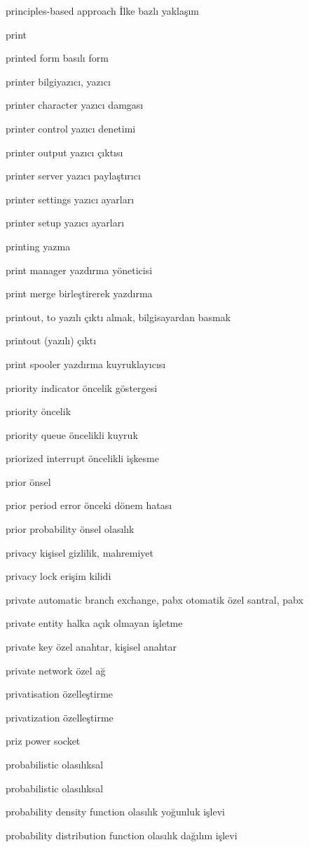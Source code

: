 \documentclass[12pt,fleqn]{article}\usepackage{../../common}
\begin{document}
principles-based approach İlke bazlı yaklaşım

print

printed form basılı form

printer bilgiyazıcı, yazıcı

printer character yazıcı damgası

printer control yazıcı denetimi

printer output yazıcı çıktısı

printer server yazıcı paylaştırıcı

printer settings yazıcı ayarları

printer setup yazıcı ayarları

printing yazma

print manager yazdırma yöneticisi

print merge birleştirerek yazdırma

printout, to yazılı çıktı almak, bilgisayardan basmak

printout (yazılı) çıktı

print spooler yazdırma kuyruklayıcısı

priority indicator öncelik göstergesi

priority öncelik

priority queue öncelikli kuyruk

priorized interrupt öncelikli işkesme

prior önsel

prior period error önceki dönem hatası

prior probability önsel olasılık

privacy kişisel gizlilik, mahremiyet

privacy lock erişim kilidi

private automatic branch exchange, pabx otomatik özel santral, pabx

private entity halka açık olmayan işletme

private key özel anahtar, kişisel anahtar

private network özel ağ

privatisation özelleştirme

privatization özelleştirme

priz power socket

probabilistic olasılıksal

probabilistic olasılıksal

probability density function olasılık yoğunluk işlevi

probability distribution function olasılık dağılım işlevi
\end{document}
